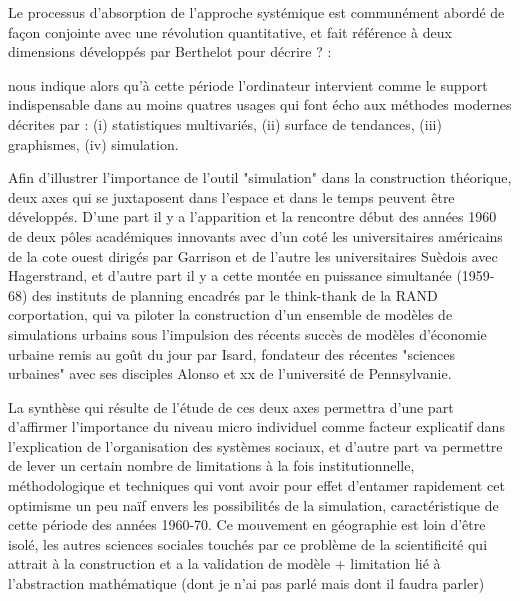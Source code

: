 Le processus d'absorption de l'approche systémique est communément abordé de façon conjointe avec une révolution quantitative, et fait référence à deux dimensions développés par Berthelot pour décrire ? :   %
 
\autocite{Haggett1969} nous indique alors qu'à cette période l'ordinateur intervient comme le support indispensable dans au moins quatres usages qui font écho aux méthodes modernes décrites par \autocite{Claval1977} : (i) statistiques multivariés, (ii) surface de tendances, (iii) graphismes, (iv) simulation. 

Afin d'illustrer l'importance de l'outil "simulation" dans la construction théorique, deux axes qui se juxtaposent dans l'espace et dans le temps peuvent être développés. D'une part il y a l'apparition et la rencontre début des années 1960 de deux pôles académiques innovants avec d'un coté les universitaires américains de la cote ouest dirigés par Garrison et de l'autre les universitaires Suèdois avec Hagerstrand, et d'autre part il y a cette montée en puissance simultanée (1959-68) des instituts de planning encadrés par le think-thank de la RAND corportation, qui va piloter la construction d'un ensemble de modèles de simulations urbains sous l'impulsion des récents succès de modèles d'économie urbaine remis au goût du jour par Isard, fondateur des récentes "sciences urbaines" avec ses disciples Alonso et xx de l'université de Pennsylvanie. \autocite{Batty1976}

La synthèse qui résulte de l'étude de ces deux axes permettra d'une part d'affirmer l'importance du niveau micro individuel comme facteur explicatif dans l'explication de l'organisation des systèmes sociaux, et d'autre part va permettre de lever un certain nombre de limitations à la fois institutionnelle, méthodologique et techniques qui vont avoir pour effet d'entamer rapidement cet optimisme un peu naïf envers les possibilités de la simulation,  caractéristique de cette période des années 1960-70. Ce mouvement en géographie est loin d'être isolé, les autres sciences sociales touchés par ce problème de la scientificité qui attrait à la construction et a la validation de modèle + limitation lié à l'abstraction mathématique (dont je n'ai pas parlé mais dont il faudra parler) %


